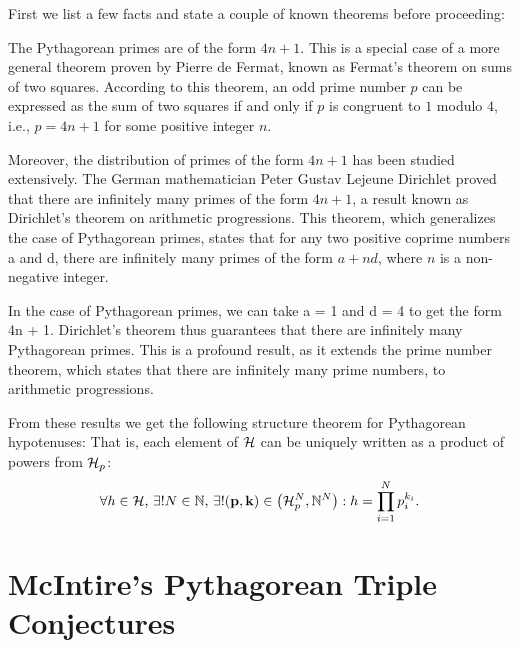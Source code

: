 \documentclass{article}
\theoremstyle{definition}
\begin{document}
First we list a few facts and state a couple of known theorems before proceeding:
\begin{enumerate}
  \item{The Pythagorean primes are of the form $4n + 1$. 
      This is a special case of a more general theorem proven by 
        Pierre de Fermat, known as Fermat's theorem on sums of two squares. 
      According to this theorem, an odd prime number $p$ can be expressed as 
        the sum of two squares if and only if 
      $p$ is congruent to $1$ modulo $4$, i.e., $p = 4n + 1$ for some 
        positive integer $n$. 
    \item{Moreover, the distribution of primes of the form $4n + 1$ has 
        been studied extensively.}
      The German mathematician Peter Gustav Lejeune Dirichlet proved that 
        there are infinitely many primes of the form $4n + 1$, a result known as 
      Dirichlet's theorem on arithmetic progressions. 
      This theorem, which generalizes the case of Pythagorean primes, states 
        that for any two positive coprime numbers a and d, 
      there are infinitely many primes of the form $a + nd$, where $n$ is a 
        non-negative integer.} 
    \item{In the case of Pythagorean primes, we can take a = 1 and d = 4 to 
        get the form 4n + 1. 
          Dirichlet's theorem thus guarantees that there are infinitely 
          many Pythagorean primes. 
        This is a profound result, as it extends the prime number theorem, 
        which states that there are infinitely many prime numbers, to 
        arithmetic progressions.}
\end{enumerate}
From these results we get the following structure theorem for 
    Pythagorean hypotenuses:
         That is, each element of ${\cal H}$ can be uniquely written as a product of powers from ${\cal H}_p$:
         \begin{eqnarray}
           \forall h \in {\cal H},\, \exists ! N \in \mathbb{N}, \, \exists ! ({\bf p},{\bf k}) \in \left({\cal H}_p^{N}, \mathbb{N}^{N}\right): h = \prod_{i=1}^N p_{i}^{k_i}.
         \end{eqnarray}

\eject
\section{McIntire's Pythagorean Triple Conjectures}
\end{document}
